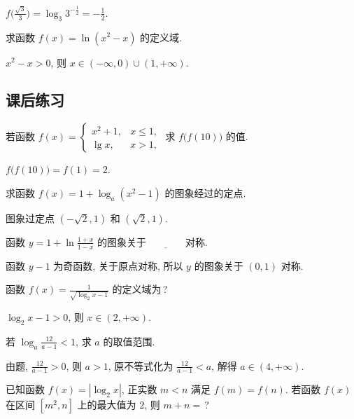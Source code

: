  \beginsolution
    $f\Big(\frac{\sqrt3}3\Big)= \log_3 3^{-\frac12}= -\frac12$.
  \endsolution
  
  \begin{exercise}
    求函数 $f(x)=\ln(x^2 -x)$ 的定义域.
  \end{exercise}

  \beginsolution
    $x^2-x>0$, 则 $x\in(-\infty,0)\cup(1,+\infty)$.
  \endsolution
  
  \subsection{课后练习}
  \begin{exercise}
    若函数 $f(x)=\begin{cases}
      x^2+1, & x\leqslant 1,\\
      \lg x, & x>1,
    \end{cases}$ 求 $f\big(f(10)\big)$ 的值.
  \end{exercise}

  \beginsolution
    $f\big(f(10)\big)=f(1)=2$.
  \endsolution
  
  \begin{exercise}
    求函数 $f(x)=1+\log_a (x^2-1)$ 的图象经过的定点.
  \end{exercise}

  \beginsolution
    图象过定点 $(-\sqrt2,1)$ 和 $(\sqrt2,1)$.
  \endsolution
  
  \begin{exercise}
    函数 $y=1+\ln\frac{1+x}{1-x}$ 的图象关于$\underline{\qquad\qquad}$对称.
  \end{exercise}

  \beginsolution
    函数 $y-1$ 为奇函数, 关于原点对称, 所以 $y$ 的图象关于 $(0,1)$ 对称.
  \endsolution
  
  \begin{exercise}
    函数 $f(x)=\frac1{\sqrt{\log_2 x-1}}$ 的定义域为\,?
  \end{exercise}

  \beginsolution
    $\log_2 x-1>0$, 则 $x\in(2,+\infty)$.
  \endsolution
  
  \begin{exercise}
    若 $\log_a\frac{12}{a-1}<1$, 求 $a$ 的取值范围.
  \end{exercise}

  \beginsolution
    由题, $\frac{12}{a-1}>0$, 则 $a>1$, 原不等式化为 $\frac{12}{a-1}<a$, 解得 $a\in(4,+\infty)$.
  \endsolution
  
  \begin{exercise}
    已知函数 $f(x)=|\log_2 x|$, 正实数 $m<n$ 满足 $f(m)=f(n)$. 
    若函数 $f(x)$ 在区间 $[m^2,n]$ 上的最大值为 $2$, 则 $m+n=$\,?
  \end{exercise}

